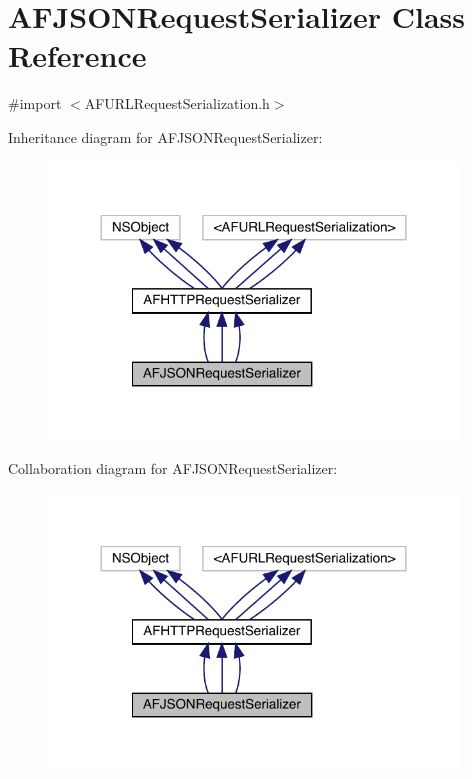 \hypertarget{interface_a_f_j_s_o_n_request_serializer}{}\section{A\+F\+J\+S\+O\+N\+Request\+Serializer Class Reference}
\label{interface_a_f_j_s_o_n_request_serializer}


{\ttfamily \#import $<$A\+F\+U\+R\+L\+Request\+Serialization.\+h$>$}



Inheritance diagram for A\+F\+J\+S\+O\+N\+Request\+Serializer\+:\nopagebreak
\begin{figure}[H]
\begin{center}
\leavevmode
\includegraphics[width=308pt]{interface_a_f_j_s_o_n_request_serializer__inherit__graph}
\end{center}
\end{figure}


Collaboration diagram for A\+F\+J\+S\+O\+N\+Request\+Serializer\+:\nopagebreak
\begin{figure}[H]
\begin{center}
\leavevmode
\includegraphics[width=308pt]{interface_a_f_j_s_o_n_request_serializer__coll__graph}
\end{center}
\end{figure}
